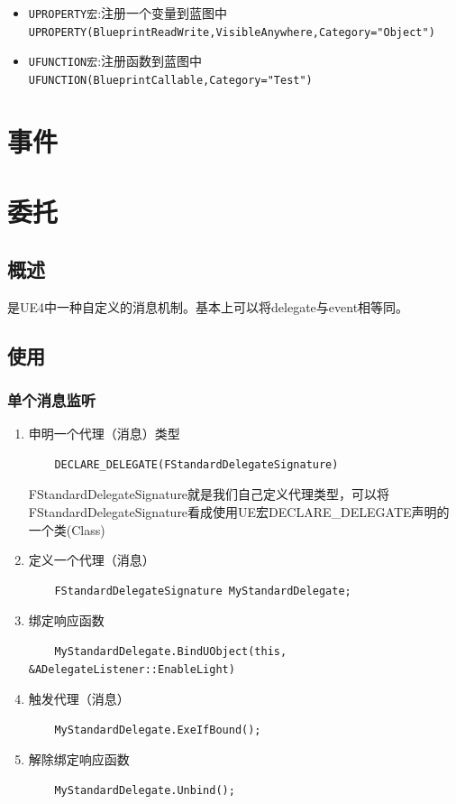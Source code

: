 \documentclass[UTF8,a4paper,12pt]{ctexbook}
\begin{document}
		\begin{itemize}
			\item \verb|UPROPERTY宏|:注册一个变量到蓝图中\verb|UPROPERTY(BlueprintReadWrite,VisibleAnywhere,Category="Object")|
			\item \verb|UFUNCTION宏|:注册函数到蓝图中 \verb|UFUNCTION(BlueprintCallable,Category="Test")|
		\end{itemize}
	
		
\chapter{事件}




	
\chapter{委托}
	\section{概述}
		是UE4中一种自定义的消息机制。基本上可以将delegate与event相等同。
	
	\section{使用}
		\subsection{单个消息监听}
			\begin{enumerate}
			\item 申明一个代理（消息）类型
				\begin{lstlisting}
	DECLARE_DELEGATE(FStandardDelegateSignature)				
				\end{lstlisting}
					
				FStandardDelegateSignature就是我们自己定义代理类型，可以将FStandardDelegateSignature看成使用UE宏DECLARE\_DELEGATE声明的一个类(Class)
			
			\item 定义一个代理（消息）
				\begin{lstlisting}
	FStandardDelegateSignature MyStandardDelegate;				
				\end{lstlisting}
							
			\item 绑定响应函数
				\begin{lstlisting}
	MyStandardDelegate.BindUObject(this, &ADelegateListener::EnableLight)				
				\end{lstlisting}
							
			\item 触发代理（消息）
				\begin{lstlisting}
	MyStandardDelegate.ExeIfBound();				
				\end{lstlisting}
							
			\item 解除绑定响应函数
				\begin{lstlisting}
	MyStandardDelegate.Unbind();				
				\end{lstlisting}			
			\end{enumerate}
		
\end{document}
